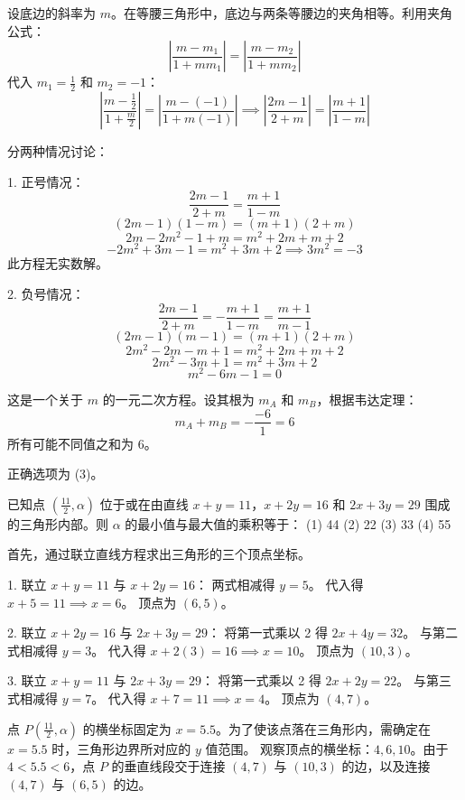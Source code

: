 \begin{questions}
\begin{solution}
设底边的斜率为 $m$。在等腰三角形中，底边与两条等腰边的夹角相等。利用夹角公式：
\[
\left| \frac{m - m_1}{1 + m m_1} \right| = \left| \frac{m - m_2}{1 + m m_2} \right|
\]
代入 $m_1 = \frac{1}{2}$ 和 $m_2 = -1$：
\[
\left| \frac{m - \frac{1}{2}}{1 + \frac{m}{2}} \right| = \left| \frac{m - (-1)}{1 + m(-1)} \right| \implies \left| \frac{2m - 1}{2 + m} \right| = \left| \frac{m + 1}{1 - m} \right|
\]

分两种情况讨论：

1. 正号情况：
\[
\frac{2m - 1}{2 + m} = \frac{m + 1}{1 - m}
\]
\[
(2m - 1)(1 - m) = (m + 1)(2 + m)
\]
\[
2m - 2m^2 - 1 + m = m^2 + 2m + m + 2
\]
\[
-2m^2 + 3m - 1 = m^2 + 3m + 2 \implies 3m^2 = -3
\]
此方程无实数解。

2. 负号情况：
\[
\frac{2m - 1}{2 + m} = -\frac{m + 1}{1 - m} = \frac{m + 1}{m - 1}
\]
\[
(2m - 1)(m - 1) = (m + 1)(2 + m)
\]
\[
2m^2 - 2m - m + 1 = m^2 + 2m + m + 2
\]
\[
2m^2 - 3m + 1 = m^2 + 3m + 2
\]
\[
m^2 - 6m - 1 = 0
\]

这是一个关于 $m$ 的一元二次方程。设其根为 $m_A$ 和 $m_B$，根据韦达定理：
\[
m_A + m_B = -\frac{-6}{1} = 6
\]
所有可能不同值之和为 $6$。

正确选项为 (3)。
\end{solution}

\question
已知点 $(\frac{11}{2}, \alpha)$ 位于或在由直线 $x + y = 11$，$x + 2y = 16$ 和 $2x + 3y = 29$ 围成的三角形内部。则 $\alpha$ 的最小值与最大值的乘积等于：
(1) 44 \quad (2) 22 \quad (3) 33 \quad (4) 55

\begin{solution}
首先，通过联立直线方程求出三角形的三个顶点坐标。

1. 联立 $x + y = 11$ 与 $x + 2y = 16$：
   两式相减得 $y = 5$。
   代入得 $x + 5 = 11 \implies x = 6$。
   顶点为 $(6, 5)$。

2. 联立 $x + 2y = 16$ 与 $2x + 3y = 29$：
   将第一式乘以 2 得 $2x + 4y = 32$。
   与第二式相减得 $y = 3$。
   代入得 $x + 2(3) = 16 \implies x = 10$。
   顶点为 $(10, 3)$。

3. 联立 $x + y = 11$ 与 $2x + 3y = 29$：
   将第一式乘以 2 得 $2x + 2y = 22$。
   与第三式相减得 $y = 7$。
   代入得 $x + 7 = 11 \implies x = 4$。
   顶点为 $(4, 7)$。

点 $P(\frac{11}{2}, \alpha)$ 的横坐标固定为 $x = 5.5$。为了使该点落在三角形内，需确定在 $x = 5.5$ 时，三角形边界所对应的 $y$ 值范围。
观察顶点的横坐标：$4, 6, 10$。由于 $4 < 5.5 < 6$，点 $P$ 的垂直线段交于连接 $(4, 7)$ 与 $(10, 3)$ 的边，以及连接 $(4, 7)$ 与 $(6, 5)$ 的边。


\end{solution}
\end{questions}
